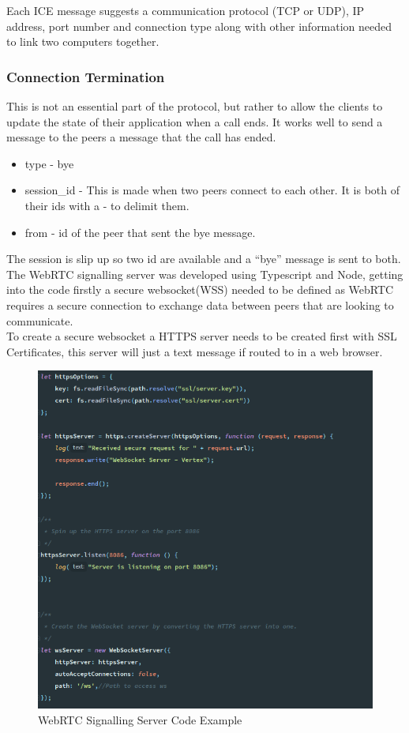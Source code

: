Each ICE message suggests a communication protocol (TCP or UDP), IP address, port number and connection type along with other information needed to link two computers together.

\subsubsection {Connection Termination}
This is not an essential part of the protocol, but rather to allow the clients to update the state of their application when a call ends. It works well to send a message to the peers a message that the call has ended.
\begin{itemize}
    \item type - bye
    \item session\_id - This is made when two peers connect to each other. It is both of their ids with a - to delimit them.
    \item from - id of the peer that sent the bye message.
\end{itemize}

The session is slip up so two id are available and a “bye” message is sent to both.
\\ The WebRTC signalling server was developed using Typescript and Node, getting into the code firstly a secure websocket(WSS) needed to be defined as WebRTC requires a secure connection to exchange data between peers that are looking to communicate. 
\\ To create a secure websocket a HTTPS server needs to be created first with SSL
Certificates, this server will just a text message if routed to in a web browser. 

\begin{figure}[h!]
    \caption{WebRTC Signalling Server Code Example}
    \label{image:webRTCSigServCode}
    \centering
    \includegraphics[width=1.0\textwidth]{images/webrtc_signalling_server_code.png}
\end{figure}

